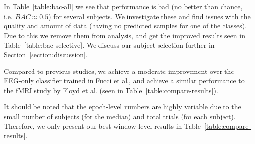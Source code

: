         In Table~\ref{table:bac-all} we see that performance is bad (no better than chance, i.e. $BAC \approx 0.5$) for several subjects. We investigate these and find issues with the quality and amount of data (having no predicted samples for one of the classes). Due to this we remove them from analysis, and get the improved results seen in Table~\ref{table:bac-selective}. We discuss our subject selection further in Section~\ref{section:discussion}.

        Compared to previous studies, we achieve a moderate improvement over the EEG-only classifier trained in Fucci et al., and achieve a similar performance to the fMRI study by Floyd et al. (seen in Table~\ref{table:compare-results}).

        

        It should be noted that the epoch-level numbers are highly variable due to the small number of subjects (for the median) and total trials (for each subject). Therefore, we only present our best window-level results in Table~\ref{table:compare-results}.

        

